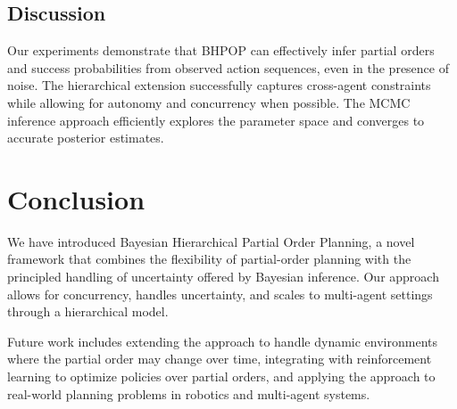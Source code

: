\documentclass[twocolumn, 10pt]{article}
\begin{document}
\subsection{Discussion}
Our experiments demonstrate that BHPOP can effectively infer partial orders and success probabilities from observed action sequences, even in the presence of noise. The hierarchical extension successfully captures cross-agent constraints while allowing for autonomy and concurrency when possible. The MCMC inference approach efficiently explores the parameter space and converges to accurate posterior estimates.

\section{Conclusion}
We have introduced Bayesian Hierarchical Partial Order Planning, a novel framework that combines the flexibility of partial-order planning with the principled handling of uncertainty offered by Bayesian inference. Our approach allows for concurrency, handles uncertainty, and scales to multi-agent settings through a hierarchical model.

Future work includes extending the approach to handle dynamic environments where the partial order may change over time, integrating with reinforcement learning to optimize policies over partial orders, and applying the approach to real-world planning problems in robotics and multi-agent systems.



\end{document}
